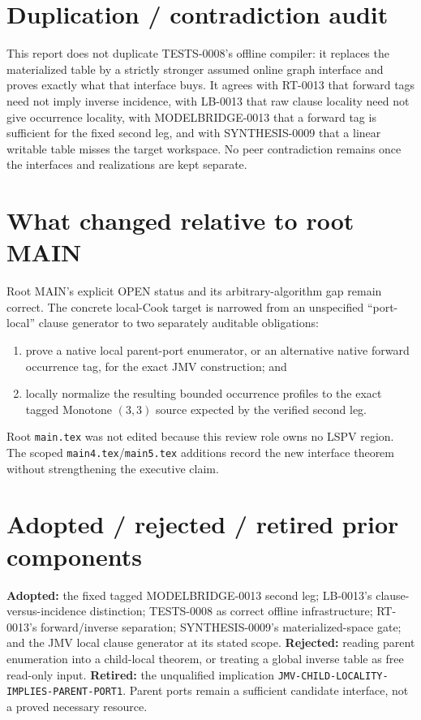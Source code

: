\documentclass[11pt]{article}
\begin{document}
\section{Duplication / contradiction audit}

This report does not duplicate TESTS-0008's offline compiler: it replaces the
materialized table by a strictly stronger assumed online graph interface and
proves exactly what that interface buys.  It agrees with RT-0013 that forward
tags need not imply inverse incidence, with LB-0013 that raw clause locality
need not give occurrence locality, with MODELBRIDGE-0013 that a forward tag
is sufficient for the fixed second leg, and with SYNTHESIS-0009 that a linear
writable table misses the target workspace.  No peer contradiction remains
once the interfaces and realizations are kept separate.

\section{What changed relative to root MAIN}

Root MAIN's explicit OPEN status and its arbitrary-algorithm gap remain
correct.  The concrete local-Cook target is narrowed from an unspecified
``port-local'' clause generator to two separately auditable obligations:
\begin{enumerate}[leftmargin=1.5em]
\item prove a native local parent-port enumerator, or an alternative native
      forward occurrence tag, for the exact JMV construction; and
\item locally normalize the resulting bounded occurrence profiles to the
      exact tagged Monotone $(3,3)$ source expected by the verified second leg.
\end{enumerate}
Root \texttt{main.tex} was not edited because this review role owns no LSPV
region.  The scoped \texttt{main4.tex}/\texttt{main5.tex} additions record the
new interface theorem without strengthening the executive claim.

\section{Adopted / rejected / retired prior components}

\textbf{Adopted:} the fixed tagged MODELBRIDGE-0013 second leg; LB-0013's
clause-versus-incidence distinction; TESTS-0008 as correct offline
infrastructure; RT-0013's forward/inverse separation; SYNTHESIS-0009's
materialized-space gate; and the JMV local clause generator at its stated
scope.  \textbf{Rejected:} reading parent enumeration into a child-local
theorem, or treating a global inverse table as free read-only input.
\textbf{Retired:} the unqualified implication
\texttt{JMV-CHILD-LOCALITY-IMPLIES-PARENT-PORT1}.  Parent ports remain a
sufficient candidate interface, not a proved necessary resource.
\end{document}
